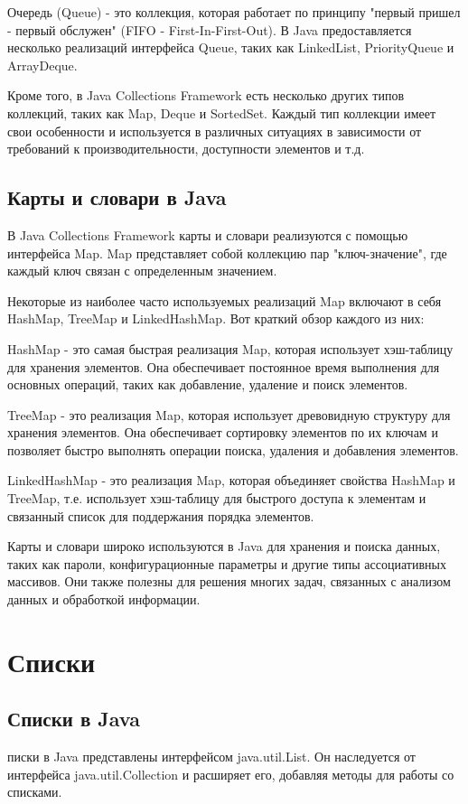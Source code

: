 Очередь (Queue) - это коллекция, которая работает по принципу "первый пришел - первый обслужен" (FIFO - First-In-First-Out). В Java предоставляется несколько реализаций интерфейса Queue, таких как \newline LinkedList, PriorityQueue и ArrayDeque.

Кроме того, в Java Collections Framework есть несколько других типов коллекций, таких как Map, Deque и SortedSet. Каждый тип коллекции имеет свои особенности и используется в различных ситуациях в зависимости от требований к производительности, доступности элементов и т.д.

\section{Карты и словари в Java}
В Java Collections Framework карты и словари реализуются с помощью интерфейса Map. Map представляет собой коллекцию пар "ключ-значение", где каждый ключ связан с определенным значением.

Некоторые из наиболее часто используемых реализаций Map включают в себя HashMap, TreeMap и LinkedHashMap. Вот краткий обзор каждого из них:

    HashMap - это самая быстрая реализация Map, которая использует хэш-таблицу для хранения элементов. Она обеспечивает постоянное время выполнения для основных операций, таких как добавление, удаление и поиск элементов.

    TreeMap - это реализация Map, которая использует древовидную структуру для хранения элементов. Она обеспечивает сортировку элементов по их ключам и позволяет быстро выполнять операции поиска, удаления и добавления элементов.

    LinkedHashMap - это реализация Map, которая объединяет свойства HashMap и TreeMap, т.е. использует хэш-таблицу для быстрого доступа к элементам и связанный список для поддержания порядка элементов.

Карты и словари широко используются в Java для хранения и поиска данных, таких как пароли, конфигурационные параметры и другие типы ассоциативных массивов. Они также полезны для решения многих задач, связанных с анализом данных и обработкой информации.

\newpage
\chapter{Списки}
\section{Списки в Java}
писки в Java представлены интерфейсом java.util.List. Он наследуется от интерфейса java.util.Collection и расширяет его, добавляя методы для работы со списками.


